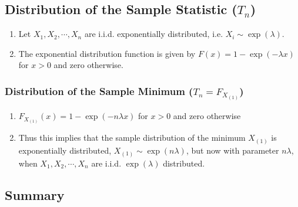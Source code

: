 \subsection{Distribution of the Sample Statistic ($T_n$)}

\begin{enumerate}
    \item Let $X_1 , X_2, \cdots , X _n$ are i.i.d. exponentially distributed, i.e. $X _i \sim \exp(\lambda )$. 
    \hfill \cite{statistics/book/Statistics-for-Data-Scientists/Maurits-Kaptein}

    \item The exponential distribution function is given by $F (x) = 1 - \exp (-\lambda x)$ for $x > 0$ and zero otherwise. 
    \hfill \cite{statistics/book/Statistics-for-Data-Scientists/Maurits-Kaptein}
\end{enumerate}

\subsubsection{Distribution of the Sample Minimum ($T_n = F _{X_{(1)}}$)}

\begin{enumerate}
    \item $F _{X_{(1)}} (x) = 1 - \exp (-n\lambda x)$ for $x > 0$ and zero otherwise
    \hfill \cite{statistics/book/Statistics-for-Data-Scientists/Maurits-Kaptein}

    \item Thus this implies that the sample distribution of the minimum $X_{(1)}$ is exponentially distributed, $X_{(1)} \sim \exp (n\lambda)$, but now with parameter $n\lambda$, when $X_1 ,X_2, \cdots , X _n$ are i.i.d. $\exp(\lambda)$ distributed.
    \hfill \cite{statistics/book/Statistics-for-Data-Scientists/Maurits-Kaptein}
\end{enumerate}



\subsection{Summary}

